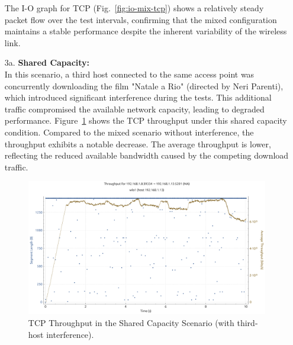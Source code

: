 \begin{enumerate}
                The I-O graph for TCP (Fig.~\ref{fig:io-mix-tcp}) shows a relatively steady packet flow over the test intervals, confirming that the mixed configuration maintains a stable performance despite the inherent variability of the wireless link.

                
            \item[3a.] \textbf{Shared Capacity:} \\
                In this scenario, a third host connected to the same access point was concurrently downloading the film "Natale a Rio" (directed by Neri Parenti), which introduced significant interference during the tests. 
                This additional traffic compromised the available network capacity, leading to degraded performance.
                Figure~\ref{fig:throughput-mitm-tcp} shows the TCP throughput under this shared capacity condition. 
                Compared to the mixed scenario without interference, the throughput exhibits a notable decrease. 
                The average throughput is lower, reflecting the reduced available bandwidth caused by the competing download traffic.

                \begin{figure}[ht]
                    \centering
                    \includegraphics[width=0.9\columnwidth]{images/graphs/Throughput/Throughput_MIX_MITM_TCP.pdf}
                    \caption{TCP Throughput in the Shared Capacity Scenario (with third-host interference).}
                    \label{fig:throughput-mitm-tcp}
                \end{figure}


\end{enumerate}
